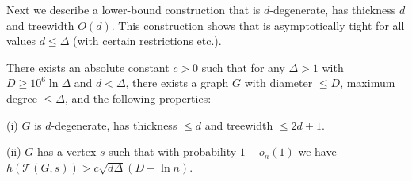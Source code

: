 \documentclass{patmorin}
\newcommand{\tcal}{\mathcal{T}}
\begin{document}
Next we describe a lower-bound construction that is $d$-degenerate,
has thickness $d$ and treewidth $O(d)$.  This construction shows that
 is asymptotically tight for
all values $d\leq\Delta$ (with certain restrictions etc.).

\begin{thm}
There exists an absolute constant $c>0$ such that
for any $\Delta>1$ with
$D\geq 10^6 \ln \Delta$
and $d < \Delta$, 
 there exists a  graph  $G$
with diameter $\leq D$, maximum degree $\leq \Delta$, and the following properties:

(i) $G$ is $d$-degenerate, has thickness $\leq d$ and treewidth $\leq 2d+1$.

(ii) $G$ has a vertex $s$ such that
with probability $1-o_n(1)$ we have $h(\tcal(G,s))>c\sqrt{d\Delta}(D+\ln n)$.

\end{thm}
\end{document}
